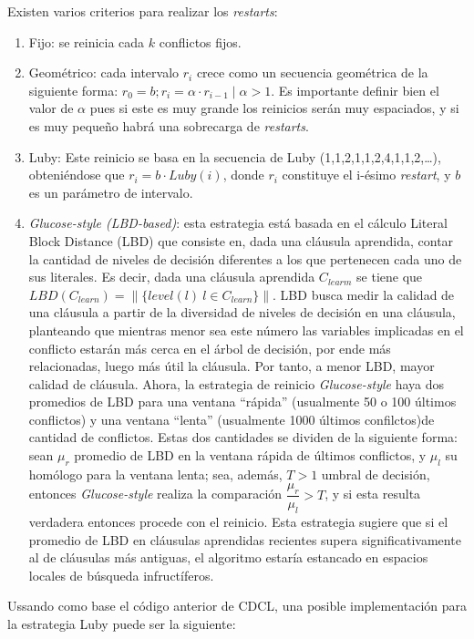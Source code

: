 Existen varios criterios para realizar los \textit{restarts}:
\begin{enumerate}
\item Fijo: se reinicia cada $k$ conflictos fijos.
\item Geométrico: cada intervalo $r_i$ crece como un secuencia geométrica de la siguiente forma: $r_0 = b; r_i = \alpha \cdot r_{i-1} \mid \alpha > 1$. Es importante definir bien el valor de $\alpha$ pues si este es muy grande los reinicios serán muy espaciados, y si es muy pequeño habrá una sobrecarga de \textit{restarts}.
\item Luby: Este reinicio se basa en la secuencia de Luby (1,1,2,1,1,2,4,1,1,2,…), obteniéndose que $r_i = b \cdot Luby(i)$, donde $r_i$ constituye el i-ésimo \textit{restart}, y $b$ es un parámetro de intervalo.
\item \textit{Glucose-style (LBD-based)}: esta estrategia está basada en el cálculo Literal Block Distance (LBD) que consiste en, dada una cláusula aprendida, contar la cantidad de niveles de decisión diferentes a los que pertenecen cada uno de sus literales. Es decir, dada una cláusula aprendida $C_{learm}$ se tiene que $LBD(C_{learn}) = \|\{level(l)\: l \in C_{learn} \}\|$. LBD busca medir la calidad de una cláusula a partir de la diversidad de niveles de decisión en una cláusula, planteando que mientras menor sea este número las variables implicadas en el conflicto estarán más cerca en el árbol de decisión, por ende más relacionadas, luego más útil la cláusula. Por tanto, a menor LBD, mayor calidad de cláusula. Ahora, la estrategia de reinicio \textit{Glucose-style} haya dos promedios de LBD para una ventana ``rápida'' (usualmente 50 o 100 últimos conflictos) y una ventana ``lenta'' (usualmente 1000 últimos confilctos)de cantidad de conflictos. Estas dos cantidades se dividen de la siguiente forma: sean $\mu_r$ promedio de LBD en la ventana rápida de últimos conflictos, y $\mu_l$ su homólogo para la ventana lenta; sea, además, $T > 1$ umbral de decisión, entonces \textit{Glucose-style} realiza la comparación $\dfrac{\mu_r}{\mu_l} > T$, y si esta resulta verdadera entonces procede con el reinicio. Esta estrategia sugiere que si el promedio de LBD en cláusulas aprendidas recientes supera significativamente al de cláusulas más antiguas, el algoritmo estaría estancado en espacios locales de búsqueda infructíferos.
\end{enumerate}

Ussando como base el código anterior de CDCL, una posible implementación para la estrategia Luby puede ser la siguiente:

